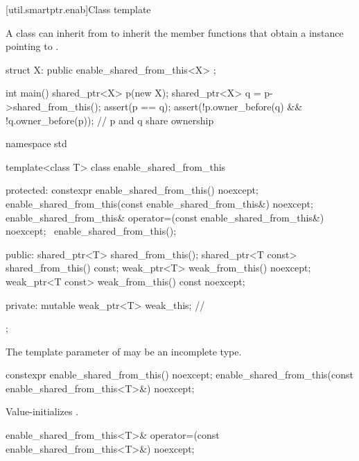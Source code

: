 [util.smartptr.enab]{Class template }

\pnum
{}%
A class  can inherit from 
to inherit the  member functions that obtain
a  instance pointing to .

\pnum
\begin{example}
\begin{codeblock}
struct X: public enable_shared_from_this<X> { };

int main() {
  shared_ptr<X> p(new X);
  shared_ptr<X> q = p->shared_from_this();
  assert(p == q);
  assert(!p.owner_before(q) && !q.owner_before(p)); // p and q share ownership
}
\end{codeblock}
\end{example}

\begin{codeblock}
namespace std {
  template<class T> class enable_shared_from_this {
  protected:
    constexpr enable_shared_from_this() noexcept;
    enable_shared_from_this(const enable_shared_from_this&) noexcept;
    enable_shared_from_this& operator=(const enable_shared_from_this&) noexcept;
    ~enable_shared_from_this();

  public:
    shared_ptr<T> shared_from_this();
    shared_ptr<T const> shared_from_this() const;
    weak_ptr<T> weak_from_this() noexcept;
    weak_ptr<T const> weak_from_this() const noexcept;

  private:
    mutable weak_ptr<T> weak_this;  // \expos
  };
}
\end{codeblock}

\pnum
The template parameter  of 
may be an incomplete type.

%
\begin{itemdecl}
constexpr enable_shared_from_this() noexcept;
enable_shared_from_this(const enable_shared_from_this<T>&) noexcept;
\end{itemdecl}

\begin{itemdescr}
\pnum
\effects
Value-initializes .
\end{itemdescr}

%
\begin{itemdecl}
enable_shared_from_this<T>& operator=(const enable_shared_from_this<T>&) noexcept;
\end{itemdecl}

